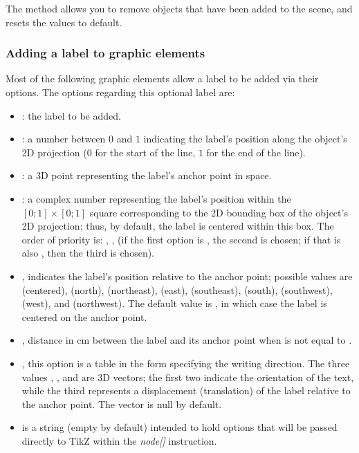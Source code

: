 The  method allows you to remove objects that have been added to the scene, and resets the values ​​to default.

\subsubsection{Adding a label to graphic elements}\label{addlabel}

Most of the following graphic elements allow a label to be added via their options. The options regarding this optional label are:

\begin{itemize}
    \item {} : the label to be added. 

    \item {} : a number between $0$ and $1$ indicating the label's position along the object's 2D projection ($0$ for the start of the line, $1$ for the end of the line). 

    \item {} : a 3D point representing the label's anchor point in space. 

    \item {} : a complex number representing the label's position within the $[0;1]\times[0;1]$ square corresponding to the 2D bounding box of the object's 2D projection; thus, by default, the label is centered within this box. 
    The order of priority is: , ,  (if the first option is \nil, the second is chosen; if that is also \nil, then the third is chosen). 

    \item {}, indicates the label's position relative to the anchor point; possible values ​​are  (centered),  (north),  (northeast),  (east),  (southeast),  (south),  (southwest),  (west), and  (northwest). The default value is , in which case the label is centered on the anchor point. 

    \item {}, distance in cm between the label and its anchor point when  is not equal to . 

    \item {}, this option is a table in the form  specifying the writing direction. The three values ​​, , and  are 3D vectors; the first two indicate the orientation of the text, while the third represents a displacement (translation) of the label relative to the anchor point. The  vector is null by default. 

    \item {} is a string (empty by default) intended to hold options that will be passed directly to TikZ within the \emph{node[]} instruction.
\end{itemize}



